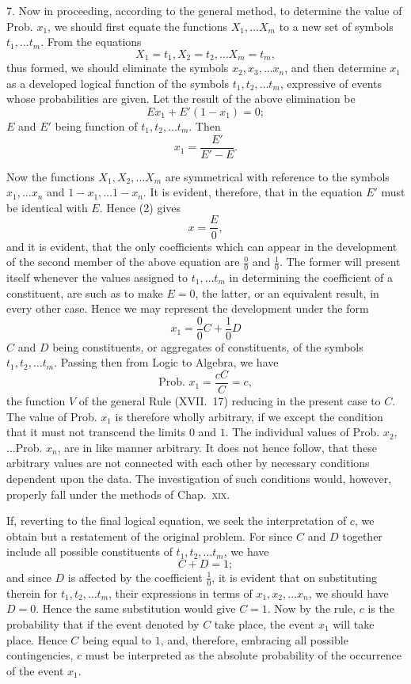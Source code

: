 \documentclass[oneside]{book}
\begin{document}
7. Now in proceeding, according to the general method, to
determine the value of Prob. $x_1$, we should first equate the functions $X_1, \dotsc X_m$ to a new set of symbols $t_1, \dotsc t_m$. From the
equations
\[
  X_1 = t_1, X_2 = t_2, \dotsc X_m = t_m,
\]
thus formed, we should eliminate the symbols $x_2, x_3,\dotsc x_n$, and
then determine $x_1$ as a developed logical function of the symbols
$t_1, t_2, \dotsc t_m$, expressive of events whose probabilities are given.
Let the result of the above elimination be
\[
  Ex_1 + E'(1-x_1) = 0;    \tag{1}
\]
$E$ and $E'$ being function of $t_1, t_2, \dotsc t_m$. Then
\[
  x_1 = \frac{E'}{E'-E}.   \tag{2}
\]

Now the functions $X_1, X_2,\dotsc X_m$ are symmetrical with reference to the symbols $x_1,\dotsc x_n$ and $1-x_1,\dotsc 1-x_n$. It is evident, therefore, that in the equation $E'$ must be identical with $E$.
Hence (2) gives
\[
  x = \frac{E}{0},
\]
and it is evident, that the only coefficients which can appear in the
development of the second member of the above equation are
$\frac{0}{0}$ and $\frac{1}{0}$. The former will present itself whenever the values
assigned to $t_1,\dotsc t_m$ in determining the coefficient of a constituent,
are such as to make $E = 0$, the latter, or an equivalent result, in
every other case. Hence we may represent the development
under the form
\[
  x_1 = \frac{0}{0}C + \frac{1}{0}D    \tag{3}
\]
$C$ and $D$ being constituents, or aggregates of constituents, of the
symbols $t_1, t_2, \dotsc t_m$.
Passing then from Logic to Algebra, we have
\[
  \text{Prob. }x_1 = \frac{cC}{C} = c,
\]
the function $V$ of the general Rule (XVII.~17) reducing in the
present case to $C$. The value of Prob. $x_1$ is therefore wholly arbitrary, if we except the condition that it must not transcend
the limits $0$ and $1$. The individual values of Prob. $x_2$, $\dotsc$Prob. $x_n$,
are in like manner arbitrary. It does not hence follow, that
these arbitrary values are not connected with each other by necessary conditions dependent upon the data. The investigation
of such conditions would, however, properly fall under the methods of Chap.~\textsc{xix}.

If, reverting to the final logical equation, we seek the interpretation of $c$, we obtain but a restatement of the original problem. For since $C$ and $D$ together include all possible constituents of $t_1, t_2, \dotsc t_m$, we have
\[
  C + D = 1;
\]
and since $D$ is affected by the coefficient $\frac{1}{0}$, it is evident that on
substituting therein for $t_1, t_2, \dotsc t_m$, their expressions in terms of
$x_1, x_2, \dotsc x_n$, we should have $D = 0$. Hence the same substitution
would give $C = 1$. Now by the rule, $c$ is the probability that if
the event denoted by $C$ take place, the event $x_1$ will take place.
Hence $C$ being equal to $1$, and, therefore, embracing all possible
contingencies, $c$ must be interpreted as the absolute probability of
the occurrence of the event $x_1$.
\end{document}
